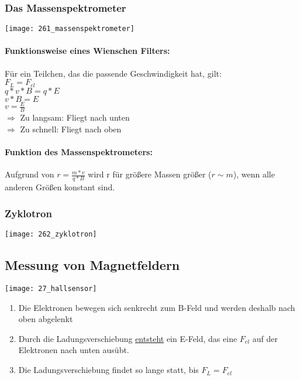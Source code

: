 \documentclass[12pt]{scrartcl}
\begin{document}
\begin{flushleft}
			\subsubsection{Das Massenspektrometer}
			\texttt{[image: 261\_massenspektrometer]}
			\newpage
			\paragraph{Funktionsweise eines Wienschen Filters:} Für ein Teilchen, das die passende Geschwindigkeit hat, gilt: 
			\vspace{2mm} \\
			$ F_L = F_{el} $
			\vspace{1mm} \\
			$ q\ast v \ast B = q \ast E $
			\vspace{1mm} \\
			$ v \ast B = E $
			\vspace{1mm} \\
			$ v = \frac{E}{B} $
			\vspace{5mm} \\
			$ \Rightarrow $ Zu langsam: Fliegt nach unten
			\vspace{1mm} \\
			$ \Rightarrow $ Zu schnell: Fliegt nach oben
			
			\paragraph{Funktion des Massenspektrometers:} Aufgrund von $r=\frac{m \ast v}{q \ast B}$ wird r für größere Massen größer ($r \sim m$), wenn alle anderen Größen konstant sind.
			
			\subsubsection{Zyklotron}
			\texttt{[image: 262\_zyklotron]}
			
		\subsection{Messung von Magnetfeldern}
		\texttt{[image: 27\_hallsensor]}\\
		
		\begin{enumerate}
			\item Die Elektronen bewegen sich senkrecht zum B-Feld und werden deshalb nach oben abgelenkt
			\item Durch die Ladungsverschiebung \underline{entsteht} ein E-Feld, das eine $F_{el}$ auf der Elektronen nach unten ausübt.
			\item Die Ladungsverschiebung findet so lange statt, bis $F_L = F_{el}$
		\end{enumerate}
		

\end{flushleft}
\end{document}
